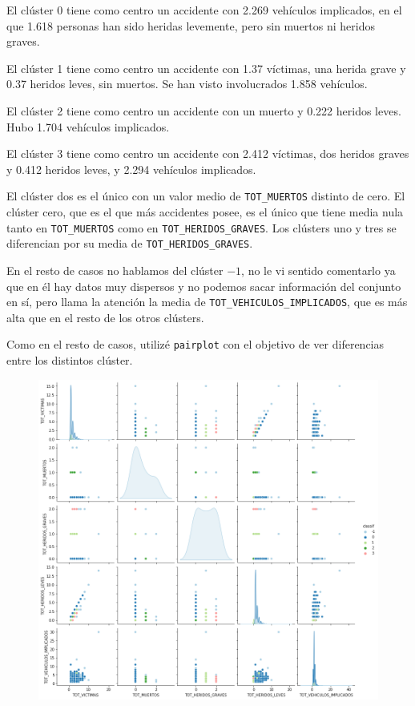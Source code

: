 \documentclass[a4]{article}
\begin{document}
El clúster 0 tiene como centro un accidente con 2.269 vehículos implicados, en el que 1.618 personas han sido heridas levemente, pero sin muertos ni heridos graves.

El clúster 1 tiene como centro un accidente con 1.37 víctimas, una herida grave y 0.37 heridos leves, sin muertos. Se han visto involucrados 1.858 vehículos.

El clúster 2 tiene como centro un accidente con un muerto y 0.222 heridos leves. Hubo 1.704 vehículos implicados.

El clúster 3 tiene como centro un accidente con 2.412 víctimas, dos heridos graves y 0.412 heridos leves, y 2.294 vehículos implicados.

El clúster dos es el único con un valor medio de \texttt{TOT\_MUERTOS} distinto de cero. El clúster cero, que es el que más accidentes posee, es el único que tiene media nula tanto en \texttt{TOT\_MUERTOS} como en \texttt{TOT\_HERIDOS\_GRAVES}. Los clústers uno y tres se diferencian por su media de \texttt{TOT\_HERIDOS\_GRAVES}.

En el resto de casos no hablamos del clúster $-1$, no le vi sentido comentarlo ya que en él hay datos muy dispersos y no podemos sacar información del conjunto en sí, pero llama la atención la media de \texttt{TOT\_VEHICULOS\_IMPLICADOS}, que es más alta que en el resto de los otros clústers.

Como en el resto de casos, utilizé \texttt{pairplot} con el objetivo de ver diferencias entre los distintos clúster.

\begin{figure}[H]
  \centering
  \includegraphics[width=180mm]{imagenes/c3_dbscan_pairplot}
\end{figure}
\end{document}
